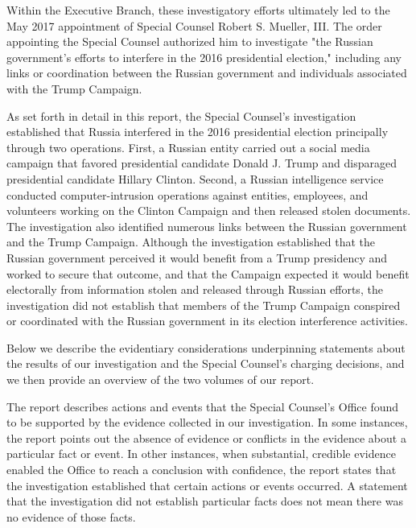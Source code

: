 Within the Executive Branch, these investigatory efforts ultimately led to the May 2017 appointment of Special Counsel Robert S. Mueller, III\null.
The order appointing the Special Counsel authorized him to investigate "the Russian government's efforts to interfere in the 2016 presidential election," including any links or coordination between the Russian government and individuals associated with the Trump Campaign.

As set forth in detail in this report, the Special Counsel's investigation established that Russia interfered in the 2016 presidential election principally through two operations.
First, a Russian entity carried out a social media campaign that favored presidential candidate Donald J. Trump and disparaged presidential candidate Hillary Clinton.
Second, a Russian intelligence service conducted computer-intrusion operations against entities, employees, and volunteers working on the Clinton Campaign and then released stolen documents.
The investigation also identified numerous links between the Russian government and the Trump Campaign.
Although the investigation established that the Russian government perceived it would benefit from a Trump presidency and worked to secure that outcome, and that the Campaign expected it would benefit electorally from information stolen and released through Russian efforts, the investigation did not establish that members of the Trump Campaign conspired or coordinated with the Russian government in its election interference activities.

\hr

Below we describe the evidentiary considerations underpinning statements about the results of our investigation and the Special Counsel's charging decisions, and we then provide an overview of the two volumes of our report.

The report describes actions and events that the Special Counsel's Office found to be supported by the evidence collected in our investigation.
In some instances, the report points out the absence of evidence or conflicts in the evidence about a particular fact or event.
In other instances, when substantial, credible evidence enabled the Office to reach a conclusion with confidence, the report states that the investigation established that certain actions or events occurred.
A statement that the investigation did not establish particular facts does not mean there was no evidence of those facts.


